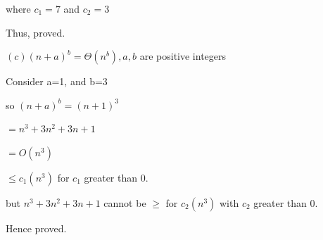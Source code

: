 \documentclass[letterpaper,portrait,12pt]{article}
\begin{document}
\begin{flushleft}
where $c_1 =7 $ and $c_2 =3 $
\end{flushleft}


\begin{flushleft}

\end{flushleft}


\begin{flushleft}
Thus, proved.
\end{flushleft}


\begin{flushleft}

\end{flushleft}


\begin{flushleft}
$(c) (n + a)^b = \Theta(n^b ), a, b$ are positive integers
\end{flushleft}


\begin{flushleft}

\end{flushleft}


\begin{flushleft}
Consider a=1, and b=3
\end{flushleft}


\begin{flushleft}

\end{flushleft}


\begin{flushleft}
so $(n + a)^b =(n+1)^3$
\end{flushleft}


\begin{flushleft}
$=n^3+3n^2+3n+1$
\end{flushleft}


\begin{flushleft}
$=O(n^3)$
\end{flushleft}


\begin{flushleft}
$\le c_1(n^3)$ for $c_1$ greater than 0.
\end{flushleft}


\begin{flushleft}
but $n^3+3n^2+3n+1$ cannot be $\ge$ for $c_2(n^3)$ with $c_2$ greater than 0.
\end{flushleft}


\begin{flushleft}
Hence proved.
\end{flushleft}
\end{document}
